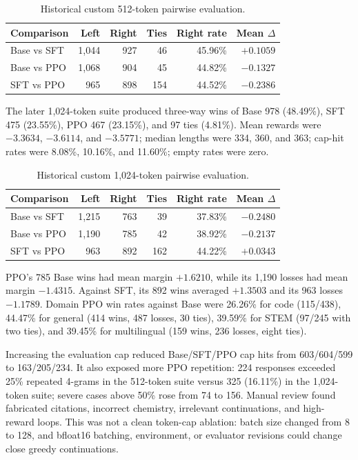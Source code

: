 \documentclass[11pt]{article}
\begin{document}
\begin{table}[H]
\centering
\caption{Historical custom 512-token pairwise evaluation.}
\begin{tabular}{@{}lrrrrr@{}}
\toprule
\textbf{Comparison} & \textbf{Left} & \textbf{Right} & \textbf{Ties} &
\textbf{Right rate} & \textbf{Mean $\Delta$}\\
\midrule
Base vs SFT & 1,044 & 927 & 46 & 45.96\% & $+0.1059$\\
Base vs PPO & 1,068 & 904 & 45 & 44.82\% & $-0.1327$\\
SFT vs PPO & 965 & 898 & 154 & 44.52\% & $-0.2386$\\
\bottomrule
\end{tabular}
\end{table}

The later 1,024-token suite produced three-way wins of Base 978 (48.49\%),
SFT 475 (23.55\%), PPO 467 (23.15\%), and 97 ties (4.81\%). Mean rewards were
$-3.3634$, $-3.6114$, and $-3.5771$; median lengths were 334, 360, and 363;
cap-hit rates were 8.08\%, 10.16\%, and 11.60\%; empty rates were zero.

\begin{table}[H]
\centering
\caption{Historical custom 1,024-token pairwise evaluation.}
\begin{tabular}{@{}lrrrrr@{}}
\toprule
\textbf{Comparison} & \textbf{Left} & \textbf{Right} & \textbf{Ties} &
\textbf{Right rate} & \textbf{Mean $\Delta$}\\
\midrule
Base vs SFT & 1,215 & 763 & 39 & 37.83\% & $-0.2480$\\
Base vs PPO & 1,190 & 785 & 42 & 38.92\% & $-0.2137$\\
SFT vs PPO & 963 & 892 & 162 & 44.22\% & $+0.0343$\\
\bottomrule
\end{tabular}
\end{table}

PPO's 785 Base wins had mean margin $+1.6210$, while its 1,190 losses had
mean margin $-1.4315$. Against SFT, its 892 wins averaged $+1.3503$ and its
963 losses $-1.1789$. Domain PPO win rates against Base were 26.26\% for code
(115/438), 44.47\% for general (414 wins, 487 losses, 30 ties), 39.59\% for
STEM (97/245 with two ties), and 39.45\% for multilingual (159 wins, 236
losses, eight ties).

Increasing the evaluation cap reduced Base/SFT/PPO cap hits from 603/604/599
to 163/205/234. It also exposed more PPO repetition: 224 responses exceeded
25\% repeated 4-grams in the 512-token suite versus 325 (16.11\%) in the
1,024-token suite; severe cases above 50\% rose from 74 to 156. Manual review
found fabricated citations, incorrect chemistry, irrelevant continuations,
and high-reward loops. This was not a clean token-cap ablation: batch size
changed from 8 to 128, and bfloat16 batching, environment, or evaluator
revisions could change close greedy continuations.
\end{document}
